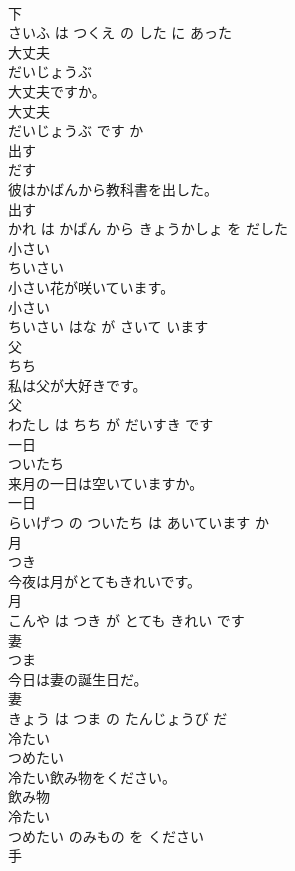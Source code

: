 \documentclass[8pt]{extreport}
\begin{document}
\begin{CJK}{UTF8}{min}
\\	下 
\\	さいふ は つくえ の した に あった			
\\	大丈夫	
\\	だいじょうぶ			
\\	大丈夫ですか。	
\\	大丈夫 
\\	だいじょうぶ です か			
\\	出す	
\\	だす			
\\	彼はかばんから教科書を出した。	
\\	出す 
\\	かれ は かばん から きょうかしょ を だした			
\\	小さい	
\\	ちいさい			
\\	小さい花が咲いています。	
\\	小さい 
\\	ちいさい はな が さいて います			
\\	父	
\\	ちち			
\\	私は父が大好きです。	
\\	父 
\\	わたし は ちち が だいすき です			
\\	一日	
\\	ついたち			
\\	来月の一日は空いていますか。	
\\	一日 
\\	らいげつ の ついたち は あいています か			
\\	月	
\\	つき			
\\	今夜は月がとてもきれいです。	
\\	月 
\\	こんや は つき が とても きれい です			
\\	妻	
\\	つま			
\\	今日は妻の誕生日だ。	
\\	妻 
\\	きょう は つま の たんじょうび だ			
\\	冷たい	
\\	つめたい			
\\	冷たい飲み物をください。	
\\	飲み物 
\\	冷たい 
\\	つめたい のみもの を ください			
\\	手	

\end{CJK}
\end{document}
